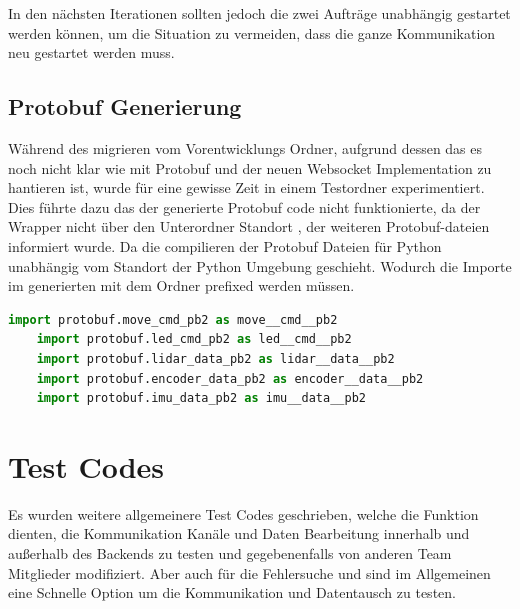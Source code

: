 In den nächsten Iterationen sollten jedoch 
die zwei Aufträge unabhängig gestartet werden können, 
um die Situation zu vermeiden, dass die ganze Kommunikation neu gestartet werden muss.

\subsection{Protobuf Generierung}
Während des migrieren vom Vorentwicklungs Ordner, 
aufgrund dessen das es noch nicht klar wie mit Protobuf 
und der neuen Websocket Implementation zu hantieren ist, 
wurde für eine gewisse Zeit in einem Testordner experimentiert.
Dies führte dazu das der generierte Protobuf code nicht funktionierte,
da der Wrapper nicht über den Unterordner Standort , 
der weiteren Protobuf-dateien informiert wurde.
Da die compilieren der Protobuf Dateien für Python unabhängig vom Standort
der Python Umgebung geschieht. 
Wodurch die Importe im generierten 
mit dem Ordner prefixed werden müssen.

\begin{lstlisting}[language=python, gobble=4]
    import protobuf.move_cmd_pb2 as move__cmd__pb2
    import protobuf.led_cmd_pb2 as led__cmd__pb2
    import protobuf.lidar_data_pb2 as lidar__data__pb2
    import protobuf.encoder_data_pb2 as encoder__data__pb2
    import protobuf.imu_data_pb2 as imu__data__pb2
\end{lstlisting}




\section{Test Codes}
Es wurden weitere allgemeinere Test Codes geschrieben, 
welche die Funktion dienten, die Kommunikation Kanäle und Daten Bearbeitung innerhalb 
und außerhalb des Backends zu testen und gegebenenfalls 
von anderen Team Mitglieder modifiziert.
% 
Aber auch für die Fehlersuche 
und sind im Allgemeinen eine Schnelle Option 
um die Kommunikation und Datentausch zu testen.


